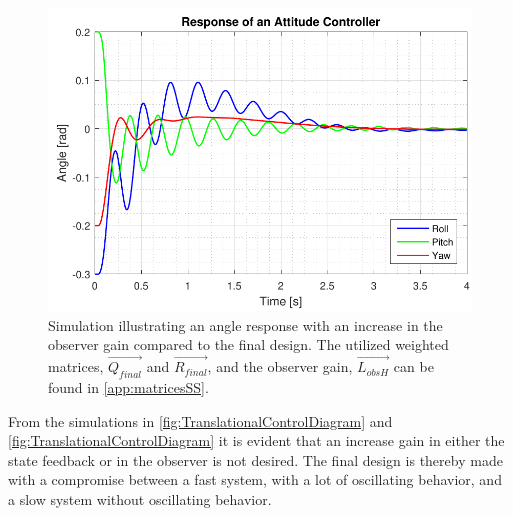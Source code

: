\begin{figure}[H]
	\centering
	\includegraphics[scale=0.8]{figures/ssEqObsHigh.pdf}
	\caption{Simulation illustrating an angle response with an increase in the observer gain compared to the final design. The utilized weighted matrices, $\vec{Q_{final}}$ and $\vec{R_{final}}$, and the observer gain, $\vec{L_{obsH}}$ can be found in \autoref{app:matricesSS}.}
	\label{fig:TranslationalControlDiagram}
\end{figure}

From the simulations in \autoref{fig:TranslationalControlDiagram} and \autoref{fig:TranslationalControlDiagram} it is evident that an increase gain in either the state feedback or in the observer is not desired. The final design is thereby made with a compromise between a fast system, with a lot of oscillating behavior, and a slow system without oscillating behavior.


